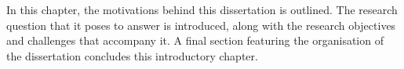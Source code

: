 In this chapter, the motivations behind this dissertation is outlined. The research question that it poses to answer is introduced, along with the research objectives and challenges that accompany it. A final section featuring the organisation of the dissertation concludes this introductory chapter.
